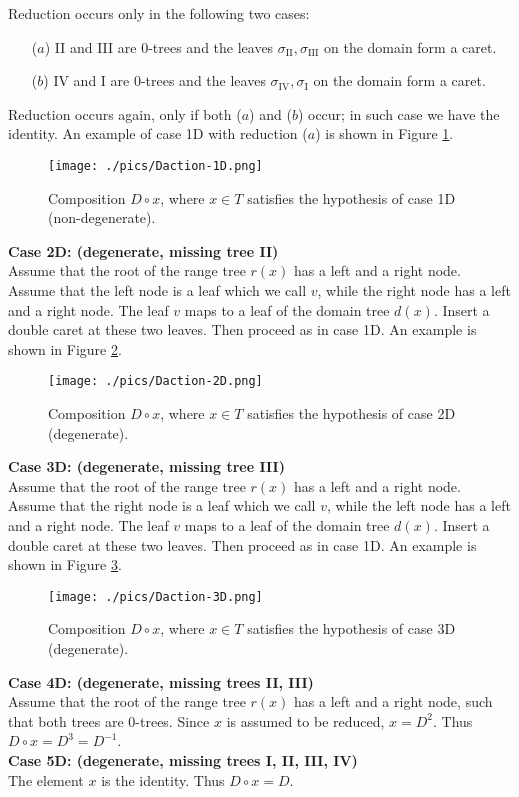 \documentclass{amsart}
\theoremstyle{definition}
\begin{document}
Reduction occurs only in the following two cases:
\begin{itemize}
\item [($a$)] II and III are 0-trees and the leaves $\sigma_{\mathrm{II}},\sigma_{\mathrm{III}}$ on the domain form a caret.
\item [($b$)] IV and I are 0-trees and the leaves $\sigma_{\mathrm{IV}},\sigma_{\mathrm{I}}$ on the domain form a caret.
\end{itemize}
Reduction occurs again, only if both ($a$) and ($b$) occur; in such case we have the identity.
An example of case 1D with reduction ($a$) is shown in Figure \ref{f:case1Dexample}.\\
\begin{figure}
\texttt{[image: ./pics/Daction-1D.png]}\\
  \caption{ Composition $D\circ x$, where $x\in T$ satisfies the hypothesis of case 1D (non-degenerate). 
  }\label{f:case1Dexample}
\end{figure}
\textbf{Case 2D: (degenerate, missing tree II)}\\
Assume that the root of the range tree $r(x)$ has a left and a right node. Assume that the left node is a leaf which we call $v$, while the right node has a left and a right node.  The leaf $v$ maps to a leaf of the domain tree $d(x)$. Insert a double caret at these two leaves. Then proceed as in case 1D. An example is shown in Figure \ref{f:case2Dexample}.\\
\begin{figure}
\texttt{[image: ./pics/Daction-2D.png]}\\
  \caption{ Composition $D\circ x$, where $x\in T$ satisfies the hypothesis of case 2D (degenerate). 
  }\label{f:case2Dexample}
\end{figure}
\textbf{Case 3D: (degenerate, missing tree III)}\\
Assume that the root of the range tree $r(x)$ has a left and a right node. Assume that the right node is a leaf which we call $v$, while the left node has a left and a right node.  The leaf $v$ maps to a leaf of the domain tree $d(x)$. Insert a double caret at these two leaves. Then proceed as in case 1D. An example is shown in Figure 
\ref{f:case3Dexample}.\\
\begin{figure}
\texttt{[image: ./pics/Daction-3D.png]}\\
  \caption{ Composition $D\circ x$, where $x\in T$ satisfies the hypothesis of case 3D (degenerate). 
  }\label{f:case3Dexample}
\end{figure}
%
\textbf{Case 4D: (degenerate, missing trees II, III)}\\
Assume that the root of the range tree $r(x)$ has a left and a right node, such that both trees are 0-trees.
Since $x$ is assumed to be reduced, $x=D^2$. Thus $D\circ x= D^3=D^{-1}$.\\
\textbf{Case 5D: (degenerate, missing trees I, II, III, IV)}\\
The element $x$ is the identity. Thus $D\circ x=D$.\\
 
\end{document}
